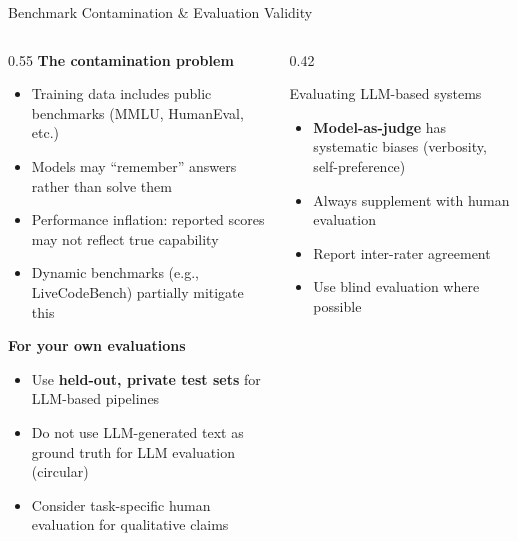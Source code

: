 \begin{frame}{Benchmark Contamination \& Evaluation Validity}
  \begin{columns}[T, onlytextwidth]
    \begin{column}{0.55\textwidth}
      \textbf{The contamination problem}\\[0.3em]
      \begin{itemize}
        \item Training data includes public benchmarks (MMLU, HumanEval, etc.)
        \item Models may ``remember'' answers rather than solve them
        \item Performance inflation: reported scores may not reflect true capability
        \item Dynamic benchmarks (e.g., LiveCodeBench) partially mitigate this
      \end{itemize}
      \vspace{0.5em}
      \textbf{For your own evaluations}\\[0.3em]
      \begin{itemize}
        \item Use \textbf{held-out, private test sets} for LLM-based pipelines
        \item Do not use LLM-generated text as ground truth for LLM evaluation (circular)
        \item Consider task-specific human evaluation for qualitative claims
      \end{itemize}
    \end{column}
    \hfill
    \begin{column}{0.42\textwidth}
      \begin{alertblock}{Evaluating LLM-based systems}
        \begin{itemize}
          \item \textbf{Model-as-judge} has systematic biases (verbosity, self-preference)
          \item Always supplement with human evaluation~\parencite{liang2022holistic}
          \item Report inter-rater agreement
          \item Use blind evaluation where possible
        \end{itemize}
      \end{alertblock}
    \end{column}
  \end{columns}
\end{frame}

